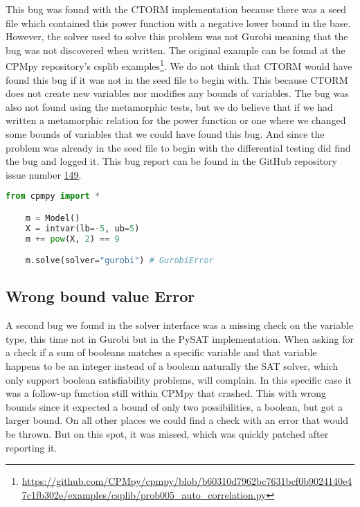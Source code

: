 This bug was found with the CTORM implementation because there was a seed file which contained this power function with a negative lower bound in the base. However, the solver used to solve this problem was not Gurobi meaning that the bug was not discovered when written. The original example can be found at the CPMpy repository's csplib examples\footnote{\url{https://github.com/CPMpy/cpmpy/blob/b60310d7962bc7631bcf0b9024140e47c1fb302e/examples/csplib/prob005_auto_correlation.py}}. We do not think that CTORM would have found this bug if it was not in the seed file to begin with. This because CTORM does not create new variables nor modifies any bounds of variables. The bug was also not found using the metamorphic tests, but we do believe that if we had written a metamorphic relation for the power function or one where we changed some bounds of variables that we could have found this bug. And since the problem was already in the seed file to begin with the differential testing did find the bug and logged it. This bug report can be found in the GitHub repository issue number \href{https://github.com/CPMpy/cpmpy/issues/149}{149}.

\label{lst:Bug:PowGurobi}
\begin{lstlisting}[language=python, caption={The "power function of Gurobi"-bug.}]
	from cpmpy import *

	m = Model()
	X = intvar(lb=-5, ub=5)
	m += pow(X, 2) == 9

	m.solve(solver="gurobi") # GurobiError
\end{lstlisting}



\subsection{Wrong bound value Error}
\label{res:bug:WrongBounds}
A second bug we found in the solver interface was a missing check on the variable type, this time not in Gurobi but in the PySAT implementation. When asking for a check if a sum of booleans matches a specific variable and that variable happens to be an integer instead of a boolean naturally the SAT solver, which only support boolean satisfiability problems, will complain. In this specific case it was a follow-up function still within CPMpy that crashed. This with wrong bounds since it expected a bound of only two possibilities, a boolean, but got a larger bound. On all other places we could find a check with an error that would be thrown. But on this spot, it was missed, which was quickly patched after reporting it.

